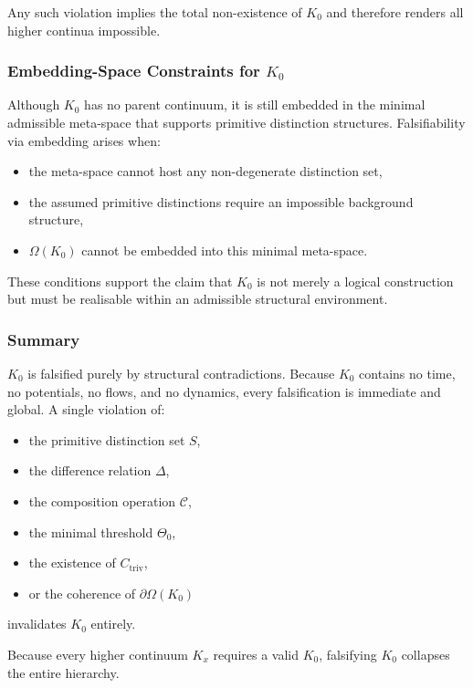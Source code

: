 Any such violation implies the total non-existence of $K_0$ and therefore 
renders all higher continua impossible.



\subsubsection{Embedding-Space Constraints for \texorpdfstring{$K_0$}{K_0}}

Although $K_0$ has no parent continuum, it is still embedded in the 
minimal admissible meta-space that supports primitive distinction
structures.
Falsifiability via embedding arises when:

\begin{itemize}
    \item the meta-space cannot host any non-degenerate distinction set,
    \item the assumed primitive distinctions require an impossible 
          background structure,
    \item $\Omega(K_0)$ cannot be embedded into this minimal meta-space.
\end{itemize}

These conditions support the claim that $K_0$ is not merely a logical
construction but must be realisable within an admissible structural 
environment.



\subsubsection{Summary}

$K_0$ is falsified purely by structural contradictions.
Because $K_0$ contains no time, no potentials, no flows, and no
dynamics, every falsification is immediate and global.
A single violation of:

\begin{itemize}
    \item the primitive distinction set $S$,
    \item the difference relation $\Delta$,
    \item the composition operation $\mathcal{C}$,
    \item the minimal threshold $\Theta_0$,
    \item the existence of $C_{\mathrm{triv}}$,
    \item or the coherence of $\partial\Omega(K_0)$
\end{itemize}

invalidates $K_0$ entirely.

Because every higher continuum $K_x$ requires a valid $K_0$,
falsifying $K_0$ collapses the entire hierarchy.
